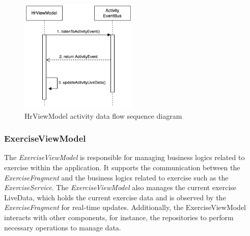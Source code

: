 \begin{figure}[H]
    \centering
    \includegraphics[width=0.5\textwidth]{diagrams/hrviewmodel-activity.drawio.png}
    \caption{HrViewModel activity data flow sequence diagram}
    \label{fig:hrviewmodel_activitydata}
\end{figure}

\subsubsection{ExerciseViewModel}
\label{chap:exerciseviewmodel_design}
The \emph{ExerciseViewModel} is responsible for managing business logics related to exercise within the application.
It supports the communication between the \emph{ExerciseFragment} and the business logics related to exercise such as the \emph{ExerciseService}.
The \emph{ExerciseViewModel} also manages the current exercise LiveData, which holds the current exercise data and is observed by the \emph{ExerciseFragment} for real-time updates. 
Additionally, the ExerciseViewModel interacts with other components, for instance, the repositories to perform necessary operations to manage data.

